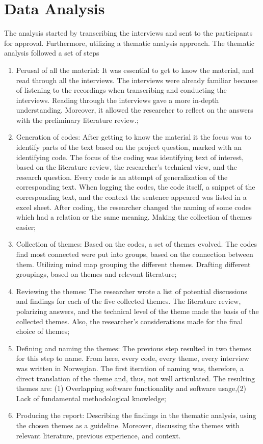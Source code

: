 \section{Data Analysis}
The analysis started by transcribing the interviews and sent to the participants for approval. Furthermore, utilizing a thematic analysis approach. The thematic analysis followed a set of steps

\begin{enumerate}
    \item Perusal of all the material: It was essential to get to know the material, and read through all the interviews. The interviews were already familiar because of listening to the recordings when transcribing and conducting the interviews. Reading through the interviews gave a more in-depth understanding. Moreover, it allowed the researcher to reflect on the answers with the preliminary literature review.; 
    \item Generation of codes: After getting to know the material it the focus was to identify parts of the text based on the project question, marked with an identifying code. The focus of the coding was identifying text of interest, based on the literature review, the researcher's technical view, and the research question. Every code is an attempt of generalization of the corresponding text. When logging the codes, the code itself, a snippet of the corresponding text, and the context the sentence appeared was listed in a excel sheet. After coding, the researcher changed the naming of some codes which had a relation or the same meaning. Making the collection of themes easier; 
    \item Collection of themes: Based on the codes, a set of themes evolved. The codes find most connected were put into groups, based on the connection between them. Utilizing mind map grouping the different themes. Drafting different groupings, based on themes and relevant literature; 
    \item  Reviewing the themes: The researcher wrote a list of potential discussions and findings for each of the five collected themes. The literature review, polarizing answers, and the technical level of the theme made the basis of the collected themes. Also, the researcher's considerations made for the final choice of themes; 
    \item Defining and naming the themes: The previous step resulted in two themes for this step to name. From here, every code, every theme, every interview was written in Norwegian. The first iteration of naming was, therefore, a direct translation of the theme and, thus, not well articulated. The resulting themes are: (1) Overlapping software functionality and software usage,(2) Lack of fundamental methodological knowledge;
    \item Producing the report: Describing the findings in the thematic analysis, using the chosen themes as a guideline. Moreover, discussing the themes with relevant literature, previous experience, and context.
\end{enumerate}

